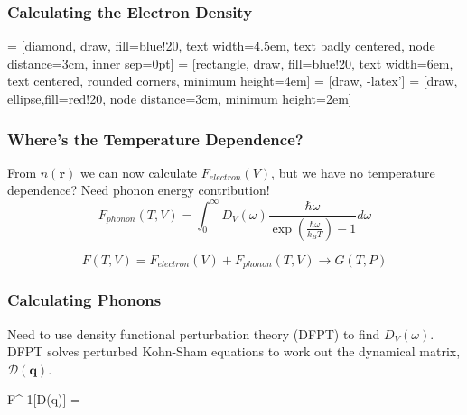 \documentclass{beamer}
\begin{document}
\begin{frame}
	\frametitle{Calculating the Electron Density}
	 = [diamond, draw, fill=blue!20, 
    text width=4.5em, text badly centered, node distance=3cm, inner sep=0pt]
 = [rectangle, draw, fill=blue!20, 
    text width=6em, text centered, rounded corners, minimum height=4em]
 = [draw, -latex']
 = [draw, ellipse,fill=red!20, node distance=3cm,
    minimum height=2em]
    

\end{frame}
\begin{frame}
	\frametitle{Where's the Temperature Dependence?}
	From $n(\mathbf r)$ we can now calculate $F_{electron}(V)$, but we have no temperature dependence?
	\pause
	\newline
	\newline
	Need phonon energy contribution!
	$$F_{phonon}(T, V) = \int_0^\infty D_V(\omega)\frac{\hbar \omega}{\exp \left(\frac{\hbar\omega}{k_B T}\right) - 1}d\omega$$

	$$F(T, V) = F_{electron}(V) + F_{phonon}(T, V) \rightarrow G(T, P)$$
\end{frame}
\begin{frame}
	\frametitle{Calculating Phonons}
	Need to use density functional perturbation theory (DFPT) to find $D_V(\omega)$.
	DFPT solves perturbed Kohn-Sham equations to work out the dynamical matrix, $\mathcal{D}(\mathbf q)$.

	$$\mathcal F^{-1}[\mathcal D(\mathbf q)] = 
\end{frame}
\end{document}

